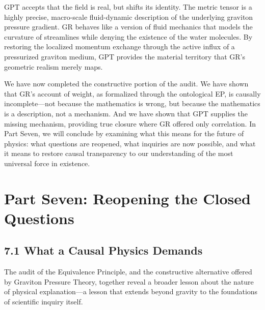 \documentclass[11pt]{article}
\begin{document}
GPT accepts that the field is real, but shifts its identity. The metric tensor is a highly precise, macro-scale fluid-dynamic description of the underlying graviton pressure gradient. GR behaves like a version of fluid mechanics that models the curvature of streamlines while denying the existence of the water molecules. By restoring the localized momentum exchange through the active influx of a pressurized graviton medium, GPT provides the material territory that GR's geometric realism merely maps.

We have now completed the constructive portion of the audit. We have shown that GR's account of weight, as formalized through the ontological EP, is causally incomplete---not because the mathematics is wrong, but because the mathematics is a description, not a mechanism. And we have shown that GPT supplies the missing mechanism, providing true closure where GR offered only correlation. In Part Seven, we will conclude by examining what this means for the future of physics: what questions are reopened, what inquiries are now possible, and what it means to restore causal transparency to our understanding of the most universal force in existence.

\section{Part Seven: Reopening the Closed Questions}

\subsection{7.1 What a Causal Physics Demands}

The audit of the Equivalence Principle, and the constructive alternative offered by Graviton Pressure Theory, together reveal a broader lesson about the nature of physical explanation---a lesson that extends beyond gravity to the foundations of scientific inquiry itself.
\end{document}
